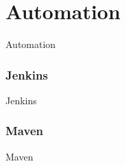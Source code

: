 \section{Automation}\label{sec:automation}
Automation

\subsubsection{Jenkins}
Jenkins

\subsubsection{Maven}
Maven
